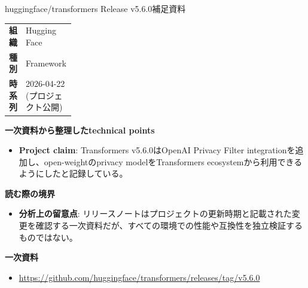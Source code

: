 \begin{technicalnote}{huggingface/transformers Release v5.6.0}{補足資料}
\begingroup
\begin{tabularx}{\linewidth}{@{}>{\bfseries}p{0.22\linewidth}X@{}}
組織 & Hugging Face \\
種別 & Framework \\
時系列 & 2026-04-22 (プロジェクト公開) \\
\end{tabularx}
\smallskip
{\bfseries 一次資料から整理したtechnical points}
\begin{itemize}[leftmargin=1.5em,itemsep=0.35em]
\item \textbf{Project claim}: Transformers v5.6.0はOpenAI Privacy Filter integrationを追加し、open-weightのprivacy modelをTransformers ecosystemから利用できるようにしたと記録している。
\end{itemize}
\begin{minipage}{\linewidth}
{\bfseries 読む際の境界}
\begin{itemize}[leftmargin=1.5em,itemsep=0.35em]
\item \textbf{分析上の留意点}: リリースノートはプロジェクトの更新時期と記載された変更を確認する一次資料だが、すべての環境での性能や互換性を独立検証するものではない。
\end{itemize}
\begin{samepage}
{\bfseries 一次資料}
\begingroup\sloppy
\begin{itemize}[leftmargin=1.5em,itemsep=0.25em]
\item {\scriptsize\url{https://github.com/huggingface/transformers/releases/tag/v5.6.0}}
\end{itemize}
\endgroup
\end{samepage}
\end{minipage}
\endgroup
\end{technicalnote}
\medskip

